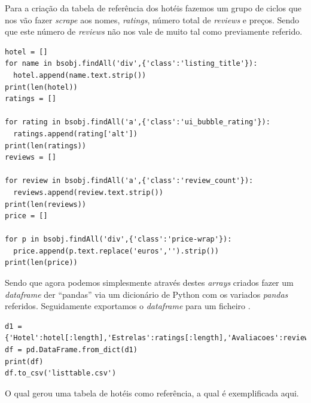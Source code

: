 \documentclass[a4paper,10pt]{article}
\begin{document}
Para a criação da tabela de referência dos hotéis fazemos um grupo de ciclos que nos vão fazer \textit{scrape} aos nomes, \textit{ratings}, número total de \textit{reviews} e preços. Sendo que este número de \textit{reviews} não nos vale de muito tal como previamente referido.

\begin{verbatim}
hotel = []
for name in bsobj.findAll('div',{'class':'listing_title'}):
  hotel.append(name.text.strip())
print(len(hotel))
ratings = []

for rating in bsobj.findAll('a',{'class':'ui_bubble_rating'}):
  ratings.append(rating['alt'])
print(len(ratings))
reviews = []

for review in bsobj.findAll('a',{'class':'review_count'}):
  reviews.append(review.text.strip())
print(len(reviews))
price = []

for p in bsobj.findAll('div',{'class':'price-wrap'}):
  price.append(p.text.replace('euros','').strip())
print(len(price))
\end{verbatim}

\newpage

Sendo que agora podemos simplesmente através destes \textit{arrays} criados fazer um \textit{dataframe} der ``pandas'' via um dicionário de Python com os variados \textit{pandas} referidos. Seguidamente exportamos o \textit{dataframe} para um ficheiro .

\begin{verbatim}
d1 = {'Hotel':hotel[:length],'Estrelas':ratings[:length],'Avaliacoes':reviews[:length],'Preco':price[:length]}
df = pd.DataFrame.from_dict(d1)
print(df)
df.to_csv('listtable.csv')
\end{verbatim}

O qual gerou uma tabela de hotéis como referência, a qual é exemplificada aqui.
\end{document}
